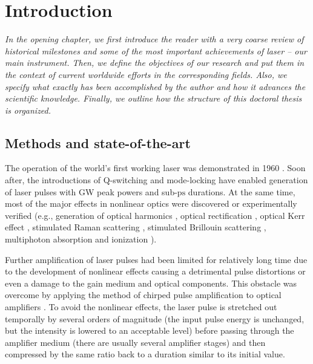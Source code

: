 \documentclass[10pt, a4paper, twoside, openright]{report}
\begin{document}
\chapter{Introduction\label{chap:intro}}
%

\noindent \textsl{In the opening chapter, we first introduce the reader with a very coarse review of historical milestones and some of the most important achievements of laser -- our main instrument. Then, we define the objectives of our research and put them in the context of current worldwide efforts in the corresponding fields. Also, we specify what exactly has been accomplished by the author and how it advances the scientific knowledge. Finally, we outline how the structure of this doctoral thesis is organized.}


\section{Methods and state-of-the-art}

The operation of the world's first working laser was demonstrated in 1960 \cite{Maiman1960}. Soon after, the introductions of Q-switching \cite{McClung1962} and mode-locking \cite{Mocker1965} have enabled generation of laser pulses with GW peak powers and sub-$ \mathrm{ps} $ durations. At the same time, most of the major effects in nonlinear optics were discovered or experimentally verified (e.g., generation of optical harmonics \cite{Franken1961}, optical rectification \cite{Bass1962}, optical Kerr effect \cite{Armstrong1962, Maker1964}, stimulated Raman scattering \cite{Woodbury1962}, stimulated Brillouin scattering \cite{Chiao1964b, Chiao1964}, multiphoton absorption and ionization \cite{Kaiser1961, Voronov1966}). 

Further amplification of laser pulses had been limited for relatively long time due to the development of nonlinear effects causing a detrimental pulse distortions or even a damage to the gain medium and optical components. This obstacle was overcome by applying the method of chirped pulse amplification to optical amplifiers \cite{Strickland1985, Maine1988}. To avoid the nonlinear effects, the laser pulse is stretched out temporally by several orders of magnitude (the input pulse energy is unchanged, but the intensity is lowered to an acceptable level) before passing through the amplifier medium (there are usually several amplifier stages) and then compressed by the same ratio back to a duration similar to its initial value.
\end{document}
